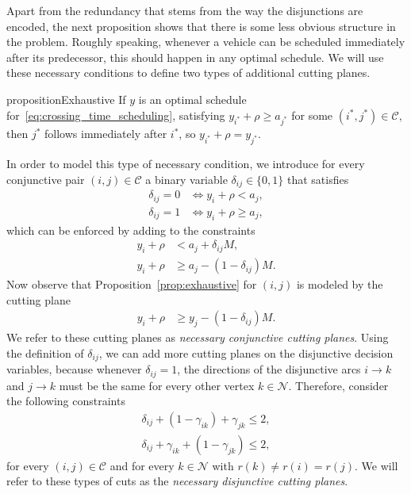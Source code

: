\documentclass[a4paper]{article}
\theoremstyle{definition}
\theoremstyle{plain}
\begin{document}

Apart from the redundancy that stems from the way the disjunctions are encoded,
the next proposition shows that there is some less obvious structure in the
problem. Roughly speaking, whenever a vehicle can be scheduled immediately after
its predecessor, this should happen in any optimal schedule. We will use these
necessary conditions to define two types of additional cutting planes.

\begin{restatable}{proposition}{Exhaustive}\label{prop:exhaustive}
  If $y$ is an optimal schedule for~\eqref{eq:crossing_time_scheduling},
  satisfying $y_{i^{*}} + \rho \geq a_{j^{*}}$ for some $(i^{*},j^{*}) \in \mathcal{C}$, then $j^{*}$
  follows immediately after $i^{*}$, so $y_{i^{*}} + \rho = y_{j^{*}}$.
\end{restatable}

In order to model this type of necessary condition, we introduce for every
conjunctive pair $(i,j) \in \mathcal{C}$ a binary variable $\delta_{ij} \in \{0, 1\}$ that
satisfies
\begin{align*}
  \delta_{ij} = 0 &\iff y_{i} + \rho < a_{j} , \\
  \delta_{ij} = 1 &\iff y_{i} + \rho \geq a_{j} ,
\end{align*}
which can be enforced by adding to the constraints
\begin{align*}
  y_{i} + \rho &< a_{j} + \delta_{ij}M , \\
  y_{i} + \rho &\geq a_{j} - (1 - \delta_{ij}) M .
\end{align*}
Now observe that Proposition~\ref{prop:exhaustive} for $(i,j)$ is modeled by the
cutting plane
\begin{align*}
  y_{i} + \rho &\geq y_{j} - (1 - \delta_{ij}) M .
\end{align*}
We refer to these cutting planes as \textit{necessary conjunctive cutting planes}.
%
Using the definition of $\delta_{ij}$, we can add more cutting planes on the
disjunctive decision variables, because whenever $\delta_{ij} = 1$, the directions of
the disjunctive arcs $i \rightarrow k$ and $j \rightarrow k$ must be the same for every other vertex
$k \in \mathcal{N}$. Therefore, consider the following constraints
\begin{align*}
  \delta_{ij} + (1 - \gamma_{ik}) + \gamma_{jk} \leq 2 , \\
  \delta_{ij} + \gamma_{ik} + (1 - \gamma_{jk}) \leq 2 ,
\end{align*}
for every $(i,j) \in \mathcal{C}$ and for every $k \in \mathcal{N}$ with $r(k) \neq r(i) = r(j)$.
We will refer to these types of cuts as the \textit{necessary disjunctive cutting planes}.
\end{document}
